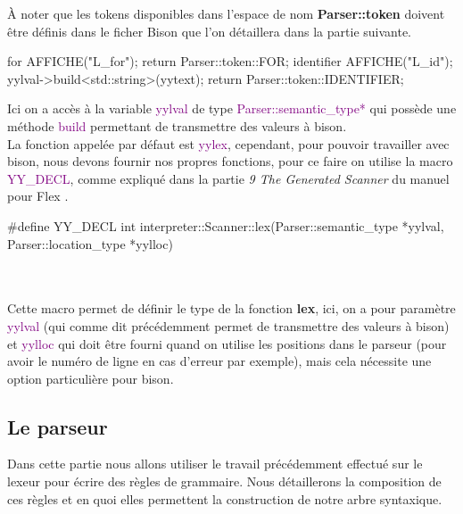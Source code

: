 \documentclass[a4paper]{article}%
\begin{document}
À noter que les tokens disponibles dans l'espace de nom \textbf{Parser::token}
doivent être définis dans le ficher Bison que l'on détaillera dans la partie
suivante.

\begin{code}
for          { AFFICHE("L_for"); return Parser::token::FOR; }
{identifier} {
  AFFICHE("L_id");
  yylval->build<std::string>(yytext);
  return Parser::token::IDENTIFIER;
}
\end{code}\leavevmode\newline

\noindent

Ici on a accès à la variable \textcolor{purple}{yylval} de type
\textcolor{purple}{Parser::semantic\_type*} qui possède une méthode
\textcolor{purple}{build} permettant de transmettre des valeurs à bison.\\

La fonction appelée par défaut est \textcolor{purple}{yylex}, cependant, pour
pouvoir travailler avec bison, nous devons fournir nos propres fonctions, pour
ce faire on utilise la macro \textcolor{purple}{YY\_DECL}, comme expliqué dans
la partie \textit{9 The Generated Scanner} du manuel pour Flex
\cite{flexmanual}.

\begin{code}
#define YY_DECL int interpreter::Scanner::lex(Parser::semantic_type *yylval, Parser::location_type *yylloc)
\end{code}\leavevmode\\~\\

Cette macro permet de définir le type de la fonction \textbf{lex}, ici,
on a pour paramètre \textcolor{purple}{yylval} (qui comme dit précédemment permet
de transmettre des valeurs à bison) et \textcolor{purple}{yylloc} qui doit être
fourni quand on utilise les positions dans le parseur (pour avoir le numéro de
ligne en cas d'erreur par exemple), mais cela nécessite une option particulière
pour bison.

\clearpage{}

\subsection{Le parseur}

Dans cette partie nous allons utiliser le travail précédemment effectué sur le
lexeur pour écrire des règles de grammaire. Nous détaillerons la
composition de ces règles et en quoi elles permettent la construction de notre
arbre syntaxique.
\end{document}
